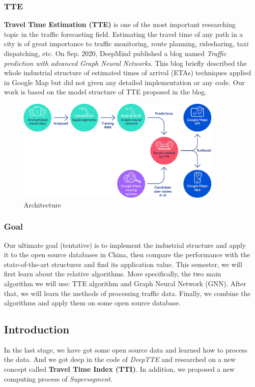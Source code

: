 \documentclass[fontset=none]{ctexart}
\theoremstyle{definition}
\theoremstyle{remark}
\begin{document}
\subsubsection{TTE}
\textbf{Travel Time Estimation (TTE)} is one of the most important researching topic in the traffic forecasting field. 
Estimating the travel time of any path in a city is of great importance to traffic monitoring, route planning, ridesharing, taxi dispatching, etc.
On Sep. 2020, DeepMind published a blog named \textit{Traffic prediction with advanced Graph Neural Networks}. 
This blog briefly described the whole industrial structure of estimated times of arrival (ETAs) techniques applied in Google Map but did not given any detailed implementation or any code.
Our work is based on the model structure of TTE proposed in the blog.
\begin{figure}[htb]
    \centering
    \includegraphics[width=0.9\textwidth]{images/architecture.png}
    \caption{Architecture}
    \label{fig1}
\end{figure}

\subsubsection{Goal}
Our ultimate goal (tentative) is to implement the industrial structure and apply it to the open source databases in China, then compare the performance with the state-of-the-art structures and find its application value.
This semester, we will first learn about the relative algorithms. More specifically, the two main algorithm we will use: TTE algorithm and Graph Neural Network (GNN). After that, we will learn the methods of processing traffic data. Finally, we combine the algorithms and apply them on some open source database.

\subsection{Introduction}
In the last stage, we have got some open source data and learned how to process the
data. And we got deep in the code of \textit{DeepTTE} and researched on a new concept
called \textbf{Travel Time Index (TTI)}. In addition, we proposed a new computing process of \textit{Supersegment}.
\end{document}
